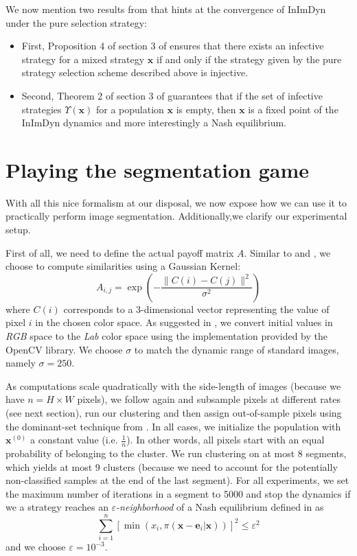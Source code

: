 \documentclass[11pt,a4paper]{article}
\begin{document}
We now mention two results from \cite{bulo-thesis} that hints at the convergence of InImDyn under the pure selection strategy: 
\begin{itemize}
    \item First, Proposition 4 of section 3 of \cite{bulo-thesis} ensures that there exists an infective strategy for a mixed strategy $\textbf{x}$ if and only if the strategy given by the pure strategy selection scheme described above is injective. 
    \item Second, Theorem 2 of section 3 of \cite{bulo-thesis} guarantees that if the set of infective strategies $\Upsilon(\mathbf{x})$ for a population $\mathbf{x}$ is empty, then $\mathbf{x}$ is a fixed point of the InImDyn dynamics and more interestingly a Nash equilibrium.
\end{itemize}

\section{Playing the segmentation game}
\label{sec:seg-game}

With all this nice formalism at our disposal, we now expose how we can use it to practically perform image segmentation. Additionally,we clarify our experimental setup. 

First of all, we need to define the actual payoff matrix $A$. Similar to \cite{bulo-thesis} and \cite{game-clustering}, we choose to compute similarities using a Gaussian Kernel:
\begin{equation}
    A_{i, j}=\exp\left(-\frac{\lVert C(i) - C(j)\rVert^2}{\sigma^2}\right)
\end{equation}
where $C(i)$ corresponds to a 3-dimensional vector representing the value of pixel $i$ in the chosen color space. As suggested in \cite{bulo-thesis}, we convert initial values in \textit{RGB} space to the \textit{Lab} color space using the implementation provided by the OpenCV library\cite{opencv_library}. We choose $\sigma$ to match the dynamic range of standard images, namely $\sigma=250$.

As computations scale quadratically with the side-length of images (because we have $n=H\times W$ pixels), we follow again \cite{bulo-thesis} and subsample pixels at different rates (see next section), run our clustering and then assign out-of-sample pixels using the dominant-set technique from \cite{dominant-set}. In all cases, we initialize the population with $\mathbf{x}^{(0)}$ a constant value (i.e. $\frac{1}{n}$). In other words, all pixels start with an equal probability of belonging to the cluster. We run clustering on at most 8 segments, which yields at most 9 clusters (because we need to account for the potentially non-classified samples at the end of the last segment). For all experiments, we set the maximum number of iterations in a segment to 5000 and stop the dynamics if we a strategy reaches an \textit{$\varepsilon$-neighborhood} of a Nash equilibrium defined in \cite{bulo-thesis} as
\begin{equation}
    \sum_{i=1}^n\left[\min(x_i, \pi(\mathbf{x}-\mathbf{e}_i|\mathbf{x}))\right]^2\leq \varepsilon^2
\end{equation}
and we choose $\varepsilon=10^{-3}$.
\end{document}
